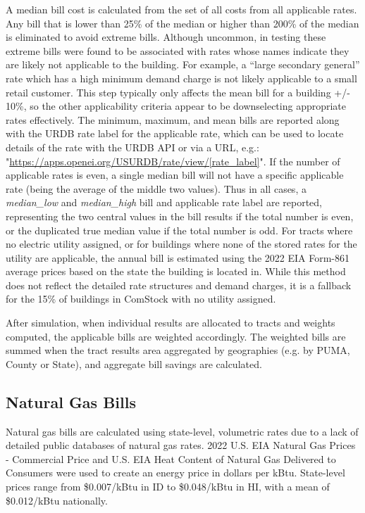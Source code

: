 A median bill cost is calculated from the set of all costs from all applicable rates. Any bill that is lower than 25\% of the median or higher than 200\% of the median is eliminated to avoid extreme bills. Although uncommon, in testing these extreme bills were found to be associated with rates whose names indicate they are likely not applicable to the building. For example, a ``large secondary general'' rate which has a high minimum demand charge is not likely applicable to a small retail customer. This step typically only affects the mean bill for a building +/- 10\%, so the other applicability criteria appear to be downselecting appropriate rates effectively. The minimum, maximum, and mean bills are reported along with the URDB rate label for the applicable rate, which can be used to locate details of the rate with the URDB API or via a URL, e.g.: "\url{https://apps.openei.org/USURDB/rate/view/[rate_label]}". If the number of applicable rates is even, a single median bill will not have a specific applicable rate (being the average of the middle two values). Thus in all cases, a \emph{median\_low} and \emph{median\_high} bill and applicable rate label are reported, representing the two central values in the bill results if the total number is even, or the duplicated true median value if the total number is odd.
For tracts where no electric utility assigned, or for buildings where none of the stored rates for the utility are applicable, the annual bill is estimated using the 2022 EIA Form-861 \citep{eia_electricity} average prices based on the state the building is located in. While this method does not reflect the detailed rate structures and demand charges, it is a fallback for the 15\% of buildings in ComStock with no utility assigned.

After simulation, when individual results are allocated to tracts and weights computed, the applicable bills are weighted accordingly. The weighted bills are summed when the tract results area aggregated by geographies (e.g. by PUMA, County or State), and aggregate bill savings are calculated. 

\subsection{Natural Gas Bills}
Natural gas bills are calculated using state-level, volumetric rates due to a lack of detailed public databases of natural gas rates. 2022 U.S. EIA Natural Gas Prices - Commercial Price and U.S. EIA Heat Content of Natural Gas Delivered to Consumers \citep{eia_natural_gas} were used to create an energy price in dollars per kBtu. State-level prices range from \$0.007/kBtu in ID to \$0.048/kBtu in HI, with a mean of \$0.012/kBtu nationally.


